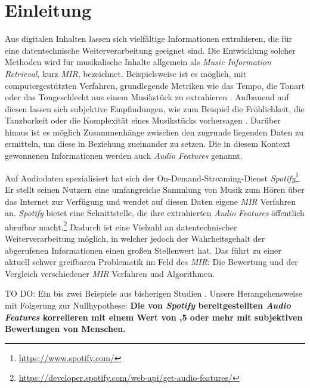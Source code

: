 \section*{Einleitung}
\label{sec:Einleitung}
Aus digitalen Inhalten lassen sich vielfältige Informationen extrahieren, die für eine datentechnische Weiterverarbeitung geeignet sind.
Die Entwicklung solcher Methoden wird für musikalische Inhalte allgemein als \textit{Music Information Retrieval}, kurz \textit{MIR}, bezeichnet.
Beispielsweise ist es möglich, mit computergestützten Verfahren, grundlegende Metriken wie das Tempo, die Tonart oder das Tongeschlecht aus einem Musikstück zu extrahieren \cite{Casey2008}.
Aufbauend auf diesen lassen sich subjektive Empfindungen, wie zum Beispiel die Fröhlichkeit, die Tanzbarkeit oder die Komplexität eines Musikstücks vorhersagen \cite{Sturm2013}.
Darüber hinaus ist es möglich Zusammenhänge zwischen den zugrunde liegenden Daten zu ermitteln, um diese in Beziehung zueinander zu setzen.
Die in diesem Kontext gewonnenen Informationen werden auch \textit{Audio Features} genannt.

Auf Audiodaten spezialisiert hat sich der On-Demand-Streaming-Dienst \textit{Spotify}\footnote{\url{https://www.spotify.com/}}.
Er stellt seinen Nutzern eine umfangreiche Sammlung von Musik zum Hören über das Internet zur Verfügung und wendet auf diesen Daten eigene \textit{MIR} Verfahren an.
\textit{Spotify} bietet eine Schnittstelle, die ihre  extrahierten \textit{Audio Features} öffentlich abrufbar macht.\footnote{\url{https://developer.spotify.com/web-api/get-audio-features/}}
Dadurch ist eine Vielzahl an datentechnischer Weiterverarbeitung möglich, in welcher jedoch der Wahrheitsgehalt der abgerufenen Informationen einen großen Stellenwert hat.
Das führt zu einer aktuell schwer greifbaren Problematik im Feld des \textit{MIR}:
Die Bewertung und der Vergleich verschiedener \textit{MIR} Verfahren und Algorithmen.

TO DO:
Ein bis zwei Beispiele aus bisherigen Studien \cite{Downie2004} \cite{Urbano_2013}.
Unsere Herangehensweise mit Folgerung zur Nullhypothese:
\textbf{Die von \textit{Spotify} bereitgestellten \textit{Audio Features} korrelieren mit einem Wert von ,5 oder mehr mit subjektiven Bewertungen von Menschen.}
